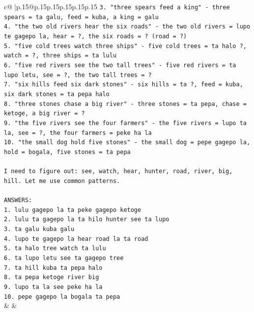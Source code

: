 \documentclass{article}
\begin{document}
{\begin{supertabular}{c@{$\;$}|p{.15\linewidth}@{}p{.15\linewidth}p{.15\linewidth}p{.15\linewidth}p{.15\linewidth}p{.15\linewidth}}
{{{\texttt{3. "three spears feed a king" {-} three spears = ta galu, feed = kuba, a king = galu} \\
\texttt{4. "the two old rivers hear the six roads" {-} the two old rivers = lupo te gagepo la, hear = ?, the six roads = ? (road = ?)} \\
\texttt{5. "five cold trees watch three ships" {-} five cold trees = ta halo ?, watch = ?, three ships = ta lulu} \\
\texttt{6. "five red rivers see the two tall trees" {-} five red rivers = ta lupo letu, see = ?, the two tall trees = ?} \\
\texttt{7. "six hills feed six dark stones" {-} six hills = ta ?, feed = kuba, six dark stones = ta pepa halo} \\
\texttt{8. "three stones chase a big river" {-} three stones = ta pepa, chase = ketoge, a big river = ?} \\
\texttt{9. "the five rivers see the four farmers" {-} the five rivers = lupo ta la, see = ?, the four farmers = peke ha la} \\
\texttt{10. "the small dog hold five stones" {-} the small dog = pepe gagepo la, hold = bogala, five stones = ta pepa} \\
\\ 
\texttt{I need to figure out: see, watch, hear, hunter, road, river, big, hill. Let me use common patterns.} \\
\\ 
\texttt{ANSWERS:} \\
\texttt{1. lulu gagepo la ta peke gagepo ketoge} \\
\texttt{2. lulu ta gagepo la ta hilo hunter see ta lupo} \\
\texttt{3. ta galu kuba galu} \\
\texttt{4. lupo te gagepo la hear road la ta road} \\
\texttt{5. ta halo tree watch ta lulu} \\
\texttt{6. ta lupo letu see ta gagepo tree} \\
\texttt{7. ta hill kuba ta pepa halo} \\
\texttt{8. ta pepa ketoge river big} \\
\texttt{9. lupo ta la see peke ha la} \\
\texttt{10. pepe gagepo la bogala ta pepa} \\
            }
        }
    }
    & & \\ \\


\end{supertabular}}
\end{document}
